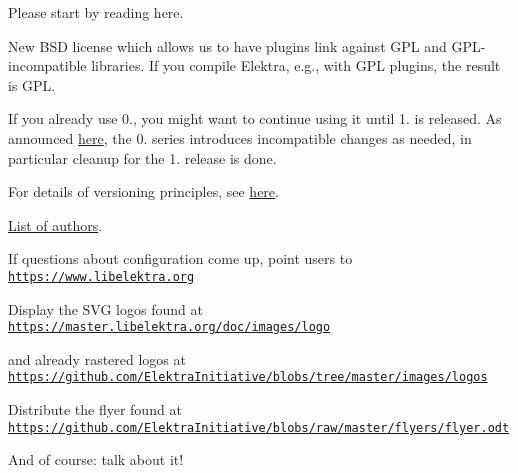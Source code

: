 Please start by reading here.

New B\+SD license which allows us to have plugins link against G\+PL and G\+P\+L-\/incompatible libraries. If you compile Elektra, e.\+g., with G\+PL plugins, the result is G\+PL.

If you already use 0., you might want to continue using it until 1. is released. As announced \hyperlink{doc_news_2019-08-06_0_9_0_md}{here}, the 0. series introduces incompatible changes as needed, in particular cleanup for the 1. release is done.

For details of versioning principles, see \hyperlink{doc_VERSION_md}{here}.

\hyperlink{doc_AUTHORS_md}{List of authors}.


\begin{DoxyItemize}
\item If questions about configuration come up, point users to \href{https://www.libelektra.org}{\tt https\+://www.\+libelektra.\+org}
\item Display the S\+VG logos found at \href{https://master.libelektra.org/doc/images/logo}{\tt https\+://master.\+libelektra.\+org/doc/images/logo}
\item and already rastered logos at \href{https://github.com/ElektraInitiative/blobs/tree/master/images/logos}{\tt https\+://github.\+com/\+Elektra\+Initiative/blobs/tree/master/images/logos}
\item Distribute the flyer found at \href{https://github.com/ElektraInitiative/blobs/raw/master/flyers/flyer.odt}{\tt https\+://github.\+com/\+Elektra\+Initiative/blobs/raw/master/flyers/flyer.\+odt}
\item And of course\+: talk about it! 
\end{DoxyItemize}